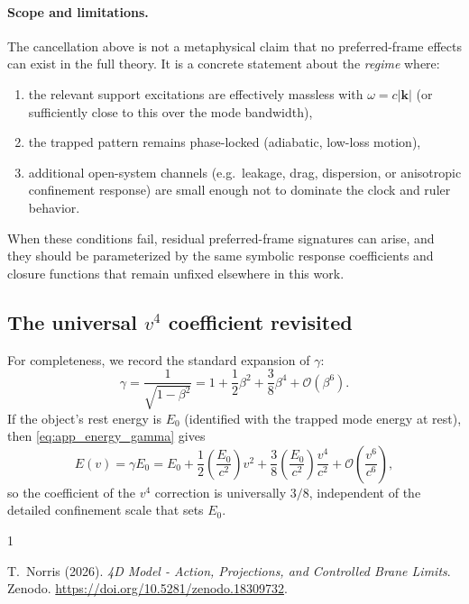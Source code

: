 \documentclass[11pt]{article}
\begin{document}
\paragraph{Scope and limitations.}
The cancellation above is not a metaphysical claim that no preferred-frame
effects can exist in the full theory. It is a concrete statement about the
\emph{regime} where:
\begin{enumerate}
\item the relevant support excitations are effectively massless with
$\omega=c|\mathbf k|$ (or sufficiently close to this over the mode bandwidth),
\item the trapped pattern remains phase-locked (adiabatic, low-loss motion),
\item additional open-system channels (e.g.\ leakage, drag, dispersion, or
anisotropic confinement response) are small enough not to dominate the clock and
ruler behavior.
\end{enumerate}
When these conditions fail, residual preferred-frame signatures can arise, and
they should be parameterized by the same symbolic response coefficients and
closure functions that remain unfixed elsewhere in this work.

\subsection{The universal $v^4$ coefficient revisited}
\label{app:standing_wave_v4}

For completeness, we record the standard expansion of $\gamma$:
\begin{equation}
\gamma
= \frac{1}{\sqrt{1-\beta^2}}
= 1 + \frac{1}{2}\beta^2 + \frac{3}{8}\beta^4 + \mathcal O(\beta^6).
\label{eq:app_gamma_series}
\end{equation}
If the object's rest energy is $E_0$ (identified with the trapped mode energy at
rest), then \eqref{eq:app_energy_gamma} gives
\begin{equation}
E(v)
= \gamma E_0
= E_0 + \frac{1}{2}\left(\frac{E_0}{c^2}\right)v^2
+ \frac{3}{8}\left(\frac{E_0}{c^2}\right)\frac{v^4}{c^2}
+ \mathcal O\!\left(\frac{v^6}{c^6}\right),
\label{eq:app_energy_series}
\end{equation}
so the coefficient of the $v^4$ correction is universally $3/8$, independent of
the detailed confinement scale that sets $E_0$.


\begin{thebibliography}{1}

T.~Norris (2026).
\newblock \emph{4D Model - Action, Projections, and Controlled Brane Limits}.
\newblock Zenodo.
\newblock \href{https://doi.org/10.5281/zenodo.18309732}{https://doi.org/10.5281/zenodo.18309732}.

\end{thebibliography}
\end{document}
